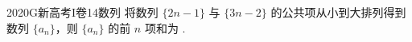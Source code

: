 
\begin{problem}{2020}{G}{新高考I卷}{14}{数列}
将数列 $ \{2n-1\} $ 与 $ \{3n-2\} $ 的公共项从小到大排列得到数列 $ \{a_n\} $，则 $ \{a_n\} $ 的前 $ n $ 项和为 \underline{\hspace{4em}}.
\end{problem}

\begin{answer}

\end{answer}

\begin{solutions}

\end{solutions}
